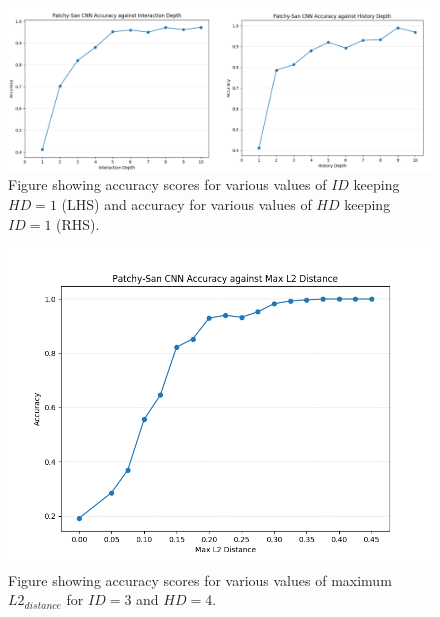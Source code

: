     \begin{figure}[H]
  \centering
  \centerline{\includegraphics[scale=0.55]{Images/inter_hist_deph_acc.png}}
  \caption{ Figure showing accuracy scores for various values of $ID$ keeping $HD = 1$ (LHS) and 
            accuracy for various values of $HD$ keeping $ID = 1$ (RHS).}
  \label{inter_hist_depth_acc}
    \end{figure}
    
      \begin{figure}[H]
  \centering
  \centerline{\includegraphics[scale=0.7]{Images/l2_dist.png}}
  \caption{ Figure showing accuracy scores for various values of maximum $L2_{distance}$ for $ID = 3$ and $HD = 4$.}
  \label{l2_dist}
    \end{figure}
    
